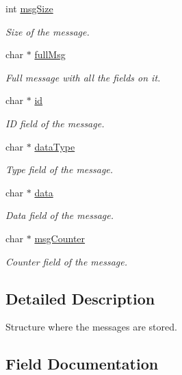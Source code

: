 \begin{DoxyCompactItemize}
int \hyperlink{struct_m_e_s_s_a_g_e_acafd8e3e9ef0f4c5e7e90fb05aeab3af}{msg\+Size}
\begin{DoxyCompactList}\small\item\em Size of the message. \end{DoxyCompactList}\item 
char $\ast$ \hyperlink{struct_m_e_s_s_a_g_e_acc701acfce6d5aefaf387fc3d681d72f}{full\+Msg}
\begin{DoxyCompactList}\small\item\em Full message with all the fields on it. \end{DoxyCompactList}\item 
char $\ast$ \hyperlink{struct_m_e_s_s_a_g_e_aecb3b0d045ada529257a2fbf8f829599}{id}
\begin{DoxyCompactList}\small\item\em ID field of the message. \end{DoxyCompactList}\item 
char $\ast$ \hyperlink{struct_m_e_s_s_a_g_e_afadf9093db8445aab513240c2461c615}{data\+Type}
\begin{DoxyCompactList}\small\item\em Type field of the message. \end{DoxyCompactList}\item 
char $\ast$ \hyperlink{struct_m_e_s_s_a_g_e_a91a70b77df95bd8b0830b49a094c2acb}{data}
\begin{DoxyCompactList}\small\item\em Data field of the message. \end{DoxyCompactList}\item 
char $\ast$ \hyperlink{struct_m_e_s_s_a_g_e_ab1cb0f33b24d0064d9bb8799dcec7444}{msg\+Counter}
\begin{DoxyCompactList}\small\item\em Counter field of the message. \end{DoxyCompactList}\end{DoxyCompactItemize}


\subsection{Detailed Description}
Structure where the messages are stored. 

\subsection{Field Documentation}
